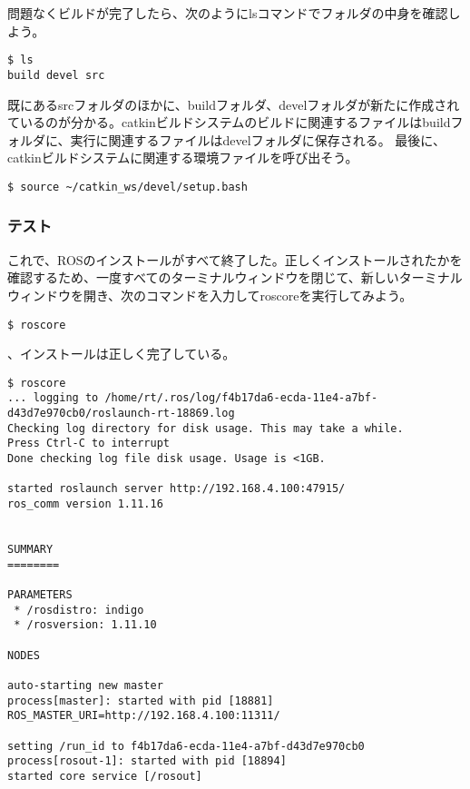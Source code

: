 問題なくビルドが完了したら、次のようにlsコマンドでフォルダの中身を確認しよう。

\begin{lstlisting}[language=ROS]
$ ls
build devel src
\end{lstlisting}

既にあるsrcフォルダのほかに、buildフォルダ、develフォルダが新たに作成されているのが分かる。catkinビルドシステムのビルドに関連するファイルはbuildフォルダに、実行に関連するファイルはdevelフォルダに保存される。
最後に、catkinビルドシステムに関連する環境ファイルを呼び出そう。

\begin{lstlisting}[language=ROS]
$ source ~/catkin_ws/devel/setup.bash
\end{lstlisting}

\subsubsection{テスト}
これで、ROSのインストールがすべて終了した。正しくインストールされたかを確認するため、一度すべてのターミナルウィンドウを閉じて、新しいターミナルウィンドウを開き、次のコマンドを入力してroscoreを実行してみよう。

\begin{lstlisting}[language=ROS]
$ roscore
\end{lstlisting}

、インストールは正しく完了している。

\begin{lstlisting}[language=ROS]
$ roscore
... logging to /home/rt/.ros/log/f4b17da6-ecda-11e4-a7bf-d43d7e970cb0/roslaunch-rt-18869.log
Checking log directory for disk usage. This may take a while.
Press Ctrl-C to interrupt
Done checking log file disk usage. Usage is <1GB.

started roslaunch server http://192.168.4.100:47915/
ros_comm version 1.11.16


SUMMARY
========

PARAMETERS
 * /rosdistro: indigo
 * /rosversion: 1.11.10

NODES

auto-starting new master
process[master]: started with pid [18881]
ROS_MASTER_URI=http://192.168.4.100:11311/

setting /run_id to f4b17da6-ecda-11e4-a7bf-d43d7e970cb0
process[rosout-1]: started with pid [18894]
started core service [/rosout]
\end{lstlisting}

